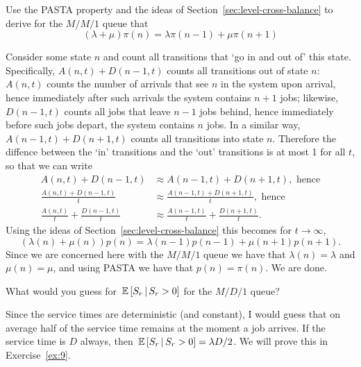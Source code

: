 \begin{question}
  Use the PASTA property and the ideas of Section~\ref{sec:level-cross-balance}
 to derive  for the $M/M/1$ queue that
  \begin{equation*}
  (\lambda + \mu) \pi(n) = \lambda \pi(n-1) + \mu \pi(n+1)
  \end{equation*}
  \begin{solution}
    Consider some state $n$ and count all transitions that `go in and
    out of' this state. Specifically, $A(n,t) + D(n-1,t)$ counts all
    transitions out of state $n$: $A(n,t)$ counts the number of
    arrivals that see $n$ in the system upon arrival, hence
    immediately after such arrivals the system contains $n+1$ jobs;
    likewise, $D(n-1,t)$ counts all jobs that leave $n-1$ jobs behind,
    hence immediately before such jobs depart, the system contains $n$
    jobs.  In a similar way, $A(n-1,t) + D(n+1,t)$ counts all
    transitions into state $n$.  Therefore the diffence between the
    `in' transitions and the `out' transitions is at most 1 for all
    $t$, so that we can write 
    \begin{equation*}
      \begin{split}
      A(n,t) + D(n-1,t) &\approx A(n-1,t) + D(n+1,t), \text{ hence} \\
      \frac{A(n,t) + D(n-1,t)}t &\approx \frac{A(n-1,t) + D(n+1,t)}t, \text{ hence} \\
      \frac{A(n,t)}t + \frac{D(n-1,t)}t &\approx \frac{A(n-1,t)}t + \frac{D(n+1,t)}t.
      \end{split}
    \end{equation*}
Using the ideas of Section~\ref{sec:level-cross-balance} this becomes for $t\to\infty$, 
\begin{equation*}
  (\lambda(n) +\mu(n))p(n) = \lambda(n-1)p(n-1) + \mu(n+1)p(n+1).
\end{equation*}
Since we are concerned here with the $M/M/1$ queue we have that
$ \lambda(n) = \lambda$ and $\mu(n) = \mu$, and using PASTA we have
that $p(n) = \pi(n)$. We are done.
  \end{solution}
\end{question}


\begin{question}
  What would you guess for $\,\mathbb{E}\left[S_r\,\middle|\, S_r>0\right]$ for the $M/D/1$ queue? 
  \begin{solution}
    Since the service times are deterministic (and constant), I would
    guess that on average half of the service time remains at the
    moment a job arrives. If the service time is $D$ always, then
    $\,\mathbb{E}\left[S_r\,\middle|\, S_r>0\right] = \lambda D/2$.  We will prove this in
    Exercise~\ref{ex:9}.
  \end{solution}
\end{question}


